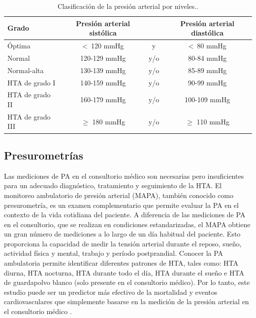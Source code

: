 \begin{table}[h]
	\centering
	\caption[Clasificación de la presión arterial por niveles]{Clasificación de la presión arterial por niveles.\protect\footnotemark.}
	\begin{tabular}{l c c c}    
		\toprule
		\textbf{Grado} 	      & \textbf{Presión arterial sistólica} 	& \textbf{}	& \textbf{Presión arterial diastólica}  \\
		\midrule
		Óptima                & <\ 120 mmHg                           & 	y			  & <\ 80 mmHg \\		
    Normal                & 120-129 mmHg                          &  	y/o			& 80-84 mmHg \\	
    Normal-alta           & 130-139 mmHg                          & 	y/o			& 85-89 mmHg \\	
    HTA de grado I        & 140-159 mmHg                          & 	y/o			& 90-99 mmHg \\
    HTA de grado II       & 160-179 mmHg                          & 	y/o			& 100-109 mmHg \\		
    HTA de grado III      & $\geq$  180 mmHg                      & 	y/o			& $\geq$  110 mmHg \\	
		\bottomrule
		\hline
	\end{tabular}
	\label{tab:TablaHTA}
\end{table}


\subsection{Presurometrías}

Las mediciones de PA en el consultorio médico son necesarias pero insuficientes para un adecuado diagnóstico, 
tratamiento y seguimiento de la HTA. El monitoreo ambulatorio de presión arterial (MAPA), también conocido 
como presurometría, es un examen complementario que permite evaluar la PA en el contexto de la vida cotidiana 
del paciente. A diferencia de las mediciones de PA en el consultorio, que se realizan en condiciones 
estandarizadas, el MAPA obtiene un gran número de mediciones a lo largo de un día habitual del paciente. 
Esto proporciona la capacidad de medir la tensión arterial durante el reposo, sueño, actividad física y mental, 
trabajo y período postprandial. Conocer la PA ambulatoria permite identificar diferentes patrones de HTA, tales 
como: HTA diurna, HTA nocturna, HTA durante todo el día, HTA durante el sueño e HTA de guardapolvo blanco 
(solo presente en el consultorio médico). Por lo tanto, este estudio puede ser un predictor más efectivo de 
la mortalidad y eventos cardiovasculares que simplemente basarse en la medición de la presión arterial en el 
consultorio médico \citep{CITE:7} \citep{CITE:5}.

